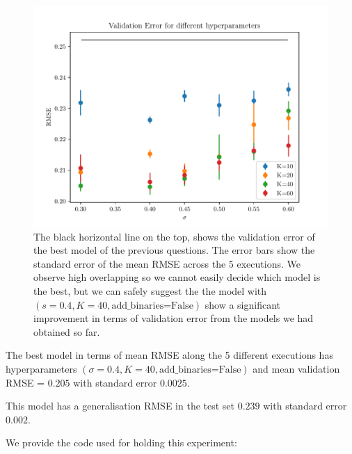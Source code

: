 \documentclass{article}
\begin{document}
\begin{figure}[h]
\includegraphics[scale=0.8]{val_error.pdf}
\caption{The black horizontal line on the top, shows the validation error of the best model of the previous questions. The error bars show the standard error of the mean RMSE across the $5$ executions. We observe high overlapping so we cannot easily decide which model is the best, but we can safely suggest the the model with $(s=0.4, K=40, \text{add\_binaries=False})$ show a significant improvement in terms of validation error from the models we had obtained so far.}
\centering
\label{fig:val_error}
\end{figure}


The best model in terms of mean RMSE along the 5 different executions has hyperparameters $(\sigma=0.4, K=40, \text{add\_binaries=False})$ and mean validation RMSE = $0.205$ with standard error $0.0025$.

This model has a generalisation RMSE in the test set $0.239$ with standard error $0.002$.


We provide the code used for holding this experiment:
\end{document}
